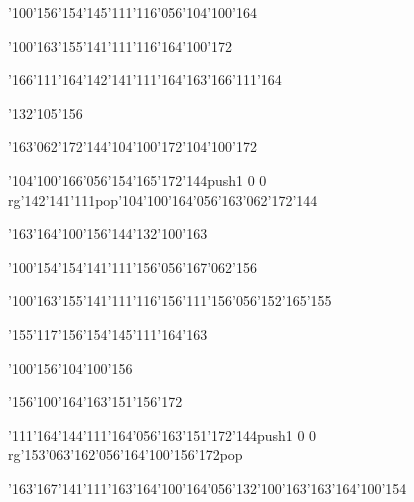 \null\vfill\ipa\centerline{\enskip\enskip\enskip\enskip\enskip\enskip\enskip\enskip\char'100\char'156\enskip\char'154\char'145\char'111\char'116\char'056\char'104\char'100\char'164}\medskip\centerline{\enskip\char'100\char'163\enskip\char'155\char'141\char'111\char'116\enskip\enskip\enskip\enskip\char'164\char'100\char'172}\medskip\centerline{\enskip\enskip\char'166\char'111\char'164\enskip\enskip\char'142\char'141\char'111\char'164\char'163\enskip\enskip\enskip\enskip\char'166\char'111\char'164}\medskip\centerline{\enskip\enskip\enskip\enskip\enskip\enskip\enskip\enskip\enskip\enskip\enskip\char'132\char'105\char'156}\medskip\centerline{\enskip\enskip\enskip\enskip\enskip\char'163\char'062\char'172\char'144\enskip\enskip\char'104\char'100\char'172\enskip\enskip\enskip\enskip\enskip\enskip\enskip\char'104\char'100\char'172}\medskip\centerline{\enskip\enskip\enskip\enskip\char'104\char'100\char'166\char'056\char'154\char'165\char'172\char'144\enskip\pdfcolorstack\match push{1 0 0 rg}\char'142\char'141\char'111\pdfcolorstack\match pop{}\enskip\char'104\char'100\char'164\char'056\char'163\char'062\char'172\char'144}\medskip\centerline{\enskip\enskip\enskip\enskip\enskip\enskip\enskip\enskip\enskip\enskip\enskip\enskip\enskip\char'163\char'164\char'100\char'156\enskip\enskip\enskip\enskip\enskip\char'144\char'132\char'100\char'163}\medskip\vfill\footline{\hfil\tt\folio\hfil}\eject
\null\vfill\ipa\centerline{\enskip\enskip\enskip\enskip\enskip\enskip\enskip\enskip\char'100\char'154\enskip\char'154\char'141\char'111\char'156\char'056\char'167\char'062\char'156}\medskip\centerline{\enskip\char'100\char'163\enskip\char'155\char'141\char'111\char'116\enskip\char'156\char'111\char'156\char'056\char'152\char'165\char'155}\medskip\centerline{\enskip\enskip\char'155\char'117\char'156\enskip\enskip\char'154\char'145\char'111\char'164\char'163\enskip\enskip\enskip\enskip\enskip\enskip\enskip}\medskip\centerline{\enskip\char'100\char'156\enskip\enskip\enskip\enskip\enskip\enskip\enskip\enskip\char'104\char'100\char'156}\medskip\centerline{\enskip\char'156\char'100\char'164\enskip\char'163\char'151\char'156\char'172\enskip\enskip\enskip\enskip\enskip\enskip\enskip\enskip\enskip\enskip\enskip\enskip\enskip\enskip\enskip}\medskip\centerline{\enskip\char'111\char'164\enskip\char'144\char'111\char'164\char'056\char'163\char'151\char'172\char'144\enskip\enskip\enskip\enskip\enskip\pdfcolorstack\match push{1 0 0 rg}\char'153\char'063\char'162\char'056\char'164\char'100\char'156\char'172\pdfcolorstack\match pop{}}\medskip\centerline{\enskip\char'163\char'167\char'141\char'111\enskip\enskip\enskip\enskip\enskip\enskip\enskip\enskip\enskip\char'163\char'164\char'100\char'164\char'056\char'132\char'100\char'163\enskip\char'163\char'164\char'100\char'154}\medskip\vfill\footline{\hfil\tt\folio\hfil}\eject
